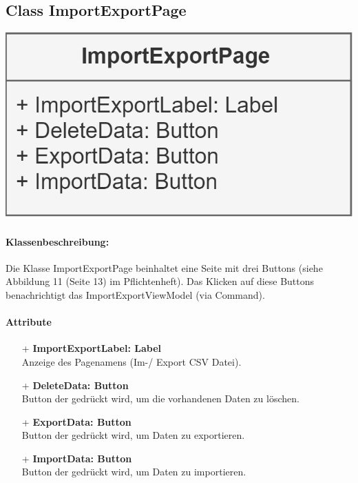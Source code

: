 \documentclass[a4paper,12pt]{article}
\begin{document}
	
\begin{minipage}[b]{0.7\textwidth}

	\subsection{Class ImportExportPage}

\end{minipage}
\begin{minipage}[c]{0.3\textwidth}
	\includegraphics[width=\textwidth]{bilder/ViewKlassen/ImportExportPage.png}
\end{minipage}
		\paragraph{Klassenbeschreibung:}
		Die Klasse ImportExportPage beinhaltet eine Seite mit drei Buttons (siehe Abbildung 11 (Seite 13) im Pflichtenheft).
		Das Klicken auf diese Buttons benachrichtigt das ImportExportViewModel (via Command).
		\paragraph{Attribute}
		\begin{itemize}
			\item[+] \textbf{ImportExportLabel: Label} \\ Anzeige des Pagenamens (Im-/ Export CSV Datei).
			\item [+]\textbf{DeleteData: Button}\\ Button der gedrückt wird, um die vorhandenen Daten zu löschen.
			\item [+]\textbf{ExportData: Button}\\ Button der gedrückt wird, um Daten zu exportieren.
			\item [+]\textbf{ImportData: Button} \\ Button der gedrückt wird, um Daten zu importieren.
		\end{itemize}
\end{document}

